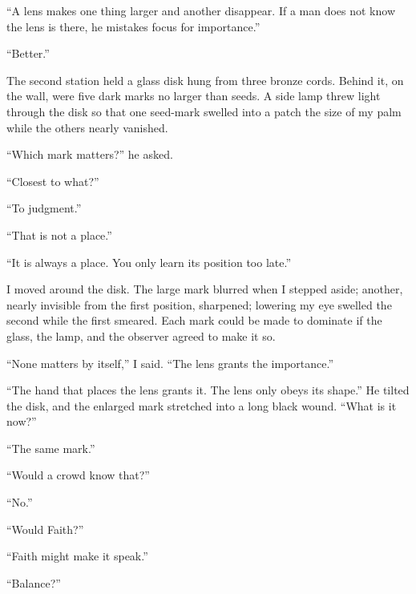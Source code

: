 ``A lens makes one thing larger and another disappear. If a man does not know the lens is there, he mistakes focus for importance.''\par

``Better.''\par

The second station held a glass disk hung from three bronze cords. Behind it, on the wall, were five dark marks no larger than seeds. A side lamp threw light through the disk so that one seed-mark swelled into a patch the size of my palm while the others nearly vanished.\par

``Which mark matters?'' he asked.\par

``Closest to what?''\par

``To judgment.''\par

``That is not a place.''\par

``It is always a place. You only learn its position too late.''\par

I moved around the disk. The large mark blurred when I stepped aside; another, nearly invisible from the first position, sharpened; lowering my eye swelled the second while the first smeared. Each mark could be made to dominate if the glass, the lamp, and the observer agreed to make it so.\par

``None matters by itself,'' I said. ``The lens grants the importance.''\par

``The hand that places the lens grants it. The lens only obeys its shape.'' He tilted the disk, and the enlarged mark stretched into a long black wound. ``What is it now?''\par

``The same mark.''\par

``Would a crowd know that?''\par

``No.''\par

``Would Faith?''\par

``Faith might make it speak.''\par

``Balance?''\par

